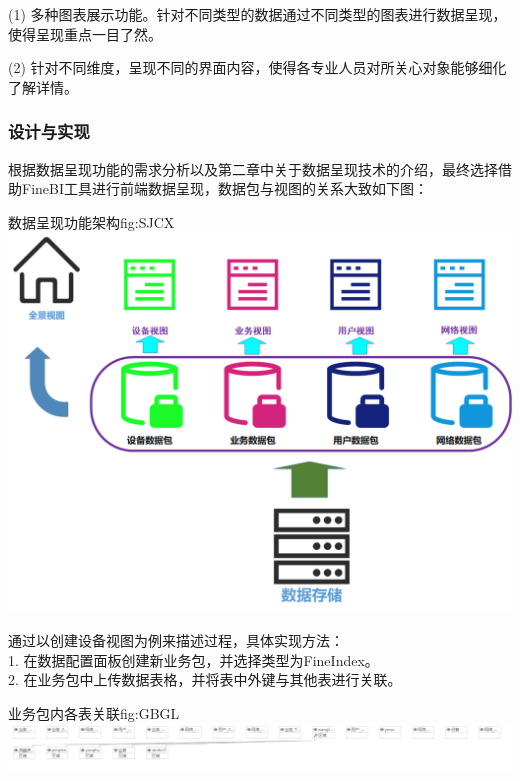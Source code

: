 \documentclass{HustGraduPaper}
\begin{document}
    (1) 多种图表展示功能。针对不同类型的数据通过不同类型的图表进行数据呈现，使得呈现重点一目了然。

    (2) 针对不同维度，呈现不同的界面内容，使得各专业人员对所关心对象能够细化了解详情。

    \subsubsection{设计与实现}
    根据数据呈现功能的需求分析以及第二章中关于数据呈现技术的介绍，最终选择借助FineBI工具进行前端数据呈现，数据包与视图的关系大致如下图：

    \begin{generalfig}{数据呈现功能架构}{fig:SJCX} 
        \includegraphics[width = \textwidth]{Figures/SJCX.png} 
    \end{generalfig}

    通过以创建设备视图为例来描述过程，具体实现方法：\\
    1. 在数据配置面板创建新业务包，并选择类型为FineIndex。\\
    2. 在业务包中上传数据表格，并将表中外键与其他表进行关联。 \\

    \begin{generalfig}{业务包内各表关联}{fig:GBGL} 
        \includegraphics[width = \textwidth]{Figures/GBGL.png} 
    \end{generalfig}
\end{document}
